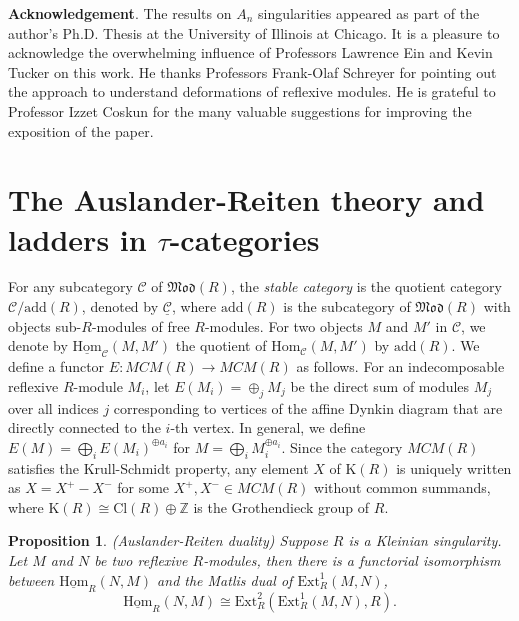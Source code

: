 \documentclass{amsart}[12pt]
\newtheorem{prop}[theorem]{Proposition}
\theoremstyle{definition}
\theoremstyle{remark}
\numberwithin{equation}{section}
\begin{document}
\textbf{Acknowledgement}. The results on $A_n$ singularities appeared as part of the author's Ph.D. Thesis at the University of Illinois at Chicago. It is a pleasure to acknowledge the overwhelming influence of Professors Lawrence Ein and Kevin Tucker on this work. He thanks Professors Frank-Olaf Schreyer for pointing out the approach to understand deformations of reflexive modules. He is grateful to Professor Izzet Coskun for the many valuable suggestions for improving the exposition of the paper. 

\appendix
\section{The Auslander-Reiten theory and ladders in $\tau$-categories}

For any subcategory $\mathcal{C}$ of $\mathfrak{Mod}(R)$, the \textit{stable category} is the quotient category $\mathcal{C}/\mathrm{add}(R)$, denoted by $\underline{\mathcal{C}}$, where $\mathrm{add}(R)$ is the subcategory of $\mathfrak{Mod}(R)$ with objects sub-$R$-modules of free $R$-modules. For two objects $M$ and $M'$ in $\mathcal{C}$, we denote by $\underline{\mathrm{Hom}}_{\mathcal{C}}(M, M')$ the quotient of $\mathrm{Hom}_{\mathcal{C}}(M, M')$ by $\mathrm{add}(R)$. We define a functor $E: MCM(R) \to MCM(R)$ as follows. For an indecomposable reflexive $R$-module $M_i$, let $E(M_i) = \oplus_j M_j$ be the direct sum of modules $M_j$ over all indices $j$ corresponding to vertices of the affine Dynkin diagram that are directly connected to the $i$-th vertex. In general, we define $E(M) = \bigoplus_iE(M_i)^{\oplus a_i}$ for $M = \bigoplus_iM_i^{\oplus a_i}$. Since the category $MCM(R)$ satisfies the Krull-Schmidt property, any element $X$ of $\mathrm{K}(R)$ is uniquely written as $X = X^+ - X^-$ for some $X^+, X^- \in MCM(R)$ without common summands, where $\mathrm{K}(R) \cong \mathrm{Cl}(R) \oplus \mathbb{Z}$ is the Grothendieck group of $R$. 

\begin{prop}
(Auslander-Reiten duality)
Suppose $R$ is a Kleinian singularity. Let $M$ and $N$ be two reflexive $R$-modules, then there is a functorial isomorphism between $\underline{\mathrm{Hom}}_{R}(N, M)$ and the Matlis dual of $\mathrm{Ext}^1_R(M, N)$, 
\[
\underline{\mathrm{Hom}}_{R}(N, M) \cong \mathrm{Ext}^2_R(\mathrm{Ext}^1_R(M, N), R).
\]
\end{prop}
\end{document}

